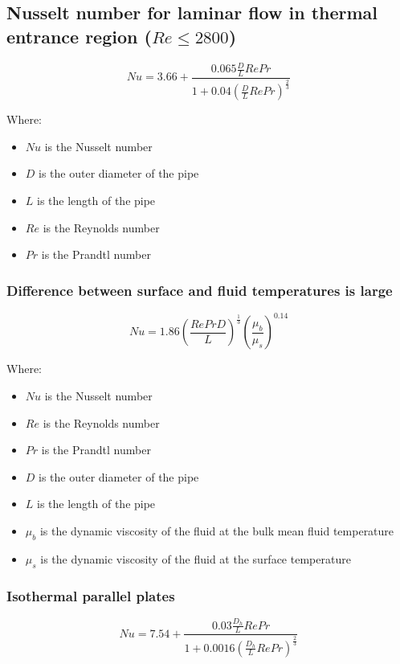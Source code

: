 \documentclass[11pt]{article}
\begin{document}
 \newpage

\subsection{Nusselt number for laminar flow in thermal entrance region (\(Re \le 2800\))}
\label{sec:org6452f16}
\[Nu = 3.66 + \frac{0.065 \frac{D}{L} Re Pr}{1 + 0.04 \left(\frac{D}{L} Re Pr \right)^{\frac{2}{3}}}\]

Where:
\begin{itemize}
\item \(Nu\) is the Nusselt number
\item \(D\) is the outer diameter of the pipe
\item \(L\) is the length of the pipe
\item \(Re\) is the Reynolds number
\item \(Pr\) is the Prandtl number
\end{itemize}

\subsubsection{Difference between surface and fluid temperatures is large}
\label{sec:orgf05750c}
\[Nu = 1.86 \left(\frac{Re Pr D}{L} \right)^{\frac{1}{3}} \left(\frac{\mu_b}{\mu_s} \right)^{0.14}\]

Where:
\begin{itemize}
\item \(Nu\) is the Nusselt number
\item \(Re\) is the Reynolds number
\item \(Pr\) is the Prandtl number
\item \(D\) is the outer diameter of the pipe
\item \(L\) is the length of the pipe
\item \(\mu_b\) is the dynamic viscosity of the fluid at the bulk mean fluid temperature
\item \(\mu_s\) is the dynamic viscosity of the fluid at the surface temperature
\end{itemize}

 \newpage

\subsubsection{Isothermal parallel plates}
\label{sec:orgee867c7}
\[Nu = 7.54 + \frac{0.03 \frac{D_h}{L} Re Pr}{1 + 0.0016 \left(\frac{D_h}{L} Re Pr \right)^{\frac{2}{3}}}\]
\end{document}
